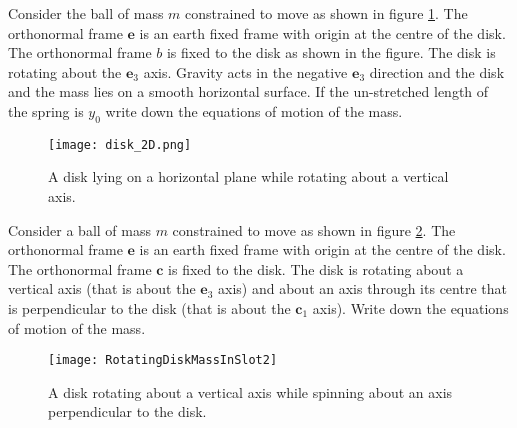 \documentclass[graybox,envcountchap,sectrefs]{svmonoMuga}
\begin{document}
\begin{exercise}\label{Ex:RotatingDiskMassInSlot}
Consider the ball of mass $m$ constrained to move as shown in figure \ref{Fig:RotatingDiskMassInSlot3}. The orthonormal frame $\mathbf{e}$ is an earth fixed frame with origin at the centre of the disk. The orthonormal frame $b$ is fixed to the disk as shown in the figure. The disk is rotating about the $\mathbf{e}_3$ axis. Gravity acts in the negative $\mathbf{e}_3$ direction and the disk and the mass lies on a smooth horizontal surface. If the un-stretched length of the spring is $y_0$ write down the equations of motion of the mass.
\begin{figure}[h]
\begin{center}
\texttt{[image: disk\_2D.png]}
\renewcommand{\baselinestretch}{1}\selectfont
\caption{A disk lying on a horizontal plane while rotating about a vertical axis.}
\label{Fig:RotatingDiskMassInSlot3}
\renewcommand{\baselinestretch}{1.5}\selectfont
\end{center}
\end{figure}
\end{exercise}


\begin{exercise}
Consider a ball of mass $m$ constrained to move as shown in figure \ref{Fig:RotatingDiskMassInSlot2}. The orthonormal frame $\mathbf{e}$ is an earth fixed frame with origin at the centre of the disk. The orthonormal frame $\mathbf{c}$ is fixed to the disk. The disk is rotating about a vertical axis (that is about the $\mathbf{e}_3$ axis) and about an axis through its centre that is perpendicular to the disk (that is about the $\mathbf{c}_1$ axis). Write down the equations of motion of the mass.
\begin{figure}[h]
\begin{center}
\texttt{[image: RotatingDiskMassInSlot2]}
\renewcommand{\baselinestretch}{1}\selectfont
\caption{A disk rotating about a vertical axis while spinning about an axis perpendicular to the disk.}
\label{Fig:RotatingDiskMassInSlot2}
\renewcommand{\baselinestretch}{1.5}\selectfont
\end{center}
\end{figure}
\end{exercise}
\end{document}
